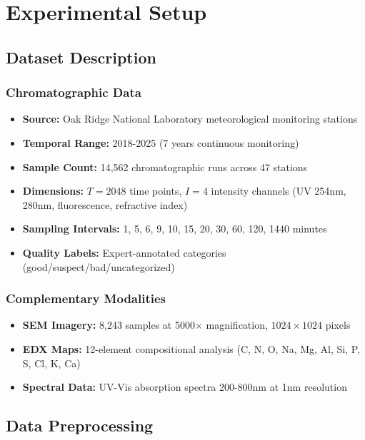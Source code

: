 \documentclass[12pt,a4paper]{article}
\begin{document}
\section{Experimental Setup}

\subsection{Dataset Description}

\subsubsection{Chromatographic Data}

\begin{itemize}
    \item \textbf{Source:} Oak Ridge National Laboratory meteorological monitoring stations
    \item \textbf{Temporal Range:} 2018-2025 (7 years continuous monitoring)
    \item \textbf{Sample Count:} 14,562 chromatographic runs across 47 stations
    \item \textbf{Dimensions:} $T=2048$ time points, $I=4$ intensity channels (UV 254nm, 280nm, fluorescence, refractive index)
    \item \textbf{Sampling Intervals:} 1, 5, 6, 9, 10, 15, 20, 30, 60, 120, 1440 minutes
    \item \textbf{Quality Labels:} Expert-annotated categories (good/suspect/bad/uncategorized)
\end{itemize}

\subsubsection{Complementary Modalities}

\begin{itemize}
    \item \textbf{SEM Imagery:} 8,243 samples at 5000$\times$ magnification, $1024 \times 1024$ pixels
    \item \textbf{EDX Maps:} 12-element compositional analysis (C, N, O, Na, Mg, Al, Si, P, S, Cl, K, Ca)
    \item \textbf{Spectral Data:} UV-Vis absorption spectra 200-800nm at 1nm resolution
\end{itemize}

\subsection{Data Preprocessing}
\end{document}
